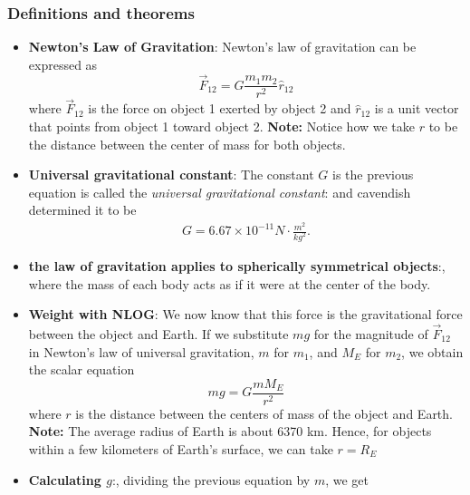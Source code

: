 \documentclass{report}
\begin{document}
    \subsubsection{Definitions and theorems}
    \begin{itemize}
        \item \textbf{Newton’s Law of Gravitation}:
            Newton's law of gravitation can be expressed as
            \begin{equation}
                \vec{F}_{12} = G \frac{m_1 m_2}{r^2} \hat{r}_{12}
            \end{equation}
            where $\vec{F}_{12}$ is the force on object 1 exerted by object 2 and $\hat{r}_{12}$ is a unit vector that points from object 1 toward object 2.
            \bigbreak \noindent 
            \bigbreak \noindent 
            \textbf{Note:} Notice how we take $r$ to be the distance between the center of mass for both objects.
        \item \textbf{Universal gravitational constant}: The constant $G$ is the previous equation is called the \textit{universal gravitational constant}: and cavendish determined it to be 
            \begin{align*}
                G = 6.67 \times 10^{-11} N \cdot \frac{m^{2}}{kg^{2}}
            .\end{align*}
        \item \textbf{the law of gravitation applies to spherically symmetrical objects}:, where the mass of each body acts as if it were at the center of the body.
        \item \textbf{Weight with NLOG}:
            We now know that this force is the gravitational force between the object and Earth. If we substitute $mg$ for the magnitude of $\vec{F}_{12}$ in Newton's law of universal gravitation, $m$ for $m_1$, and $M_E$ for $m_2$, we obtain the scalar equation
            \begin{equation}
                mg = G \frac{m M_E}{r^2}
            \end{equation}
            \bigbreak \noindent 
            where $r$ is the distance between the centers of mass of the object and Earth.
            \bigbreak \noindent 
            \textbf{Note:} The average radius of Earth is about 6370 km. Hence, for objects within a few kilometers of Earth’s surface, we can take $r=R_{E}$
        \item \textbf{Calculating $g$}:, dividing the previous equation by $m$, we get

\end{itemize}
\end{document}
